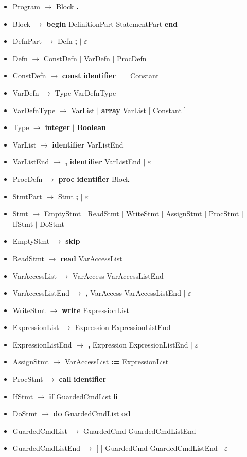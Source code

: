 \documentclass{article}
\let\bf\textbf
\newcommand{\der}{$\longrightarrow$ }
\newcommand{\es}{$\varepsilon$ }
\newcommand{\alt}{\Large$|$ \normalsize }
\begin{document}
\begin{itemize}[label={}]
    \item Program \der Block \bf .
    \item Block \der \bf{begin} DefinitionPart StatementPart \bf{end}
    \item DefnPart \der Defn \bf ; \alt \es
    \item Defn \der ConstDefn \alt VarDefn \alt ProcDefn
    \item ConstDefn \der \bf{const} \bf{identifier} $=$ Constant
    \item VarDefn \der Type VarDefnType
    \item VarDefnType \der VarList \alt \bf{array} VarList [ Constant ]
    \item Type \der \bf{integer} \alt \bf {Boolean}
    \item VarList \der \bf{identifier} VarListEnd
    \item VarListEnd \der \bf, \bf{identifier} VarListEnd \alt \es
    \item ProcDefn \der \bf{proc} \bf{identifier} Block
    \item StmtPart \der Stmt \bf ; \alt \es
    \item Stmt \der EmptyStmt \alt ReadStmt \alt WriteStmt \alt AssignStmt \alt ProcStmt \alt IfStmt \alt DoStmt
    \item EmptyStmt \der \bf{skip}
    \item ReadStmt \der \bf{read} VarAccessList
    \item VarAccessList \der VarAccess VarAccessListEnd
    \item VarAccessListEnd \der \bf , VarAccess VarAccessListEnd \alt \es
    \item WriteStmt \der \bf{write} ExpressionList
    \item ExpressionList \der Expression ExpressionListEnd
    \item ExpressionListEnd \der \bf, Expression ExpressionListEnd \alt \es 
    \item AssignStmt \der VarAccessList \bf{:=} ExpressionList
    \item ProcStmt \der \bf{call} \bf{identifier}
    \item IfStmt \der \bf{if} GuardedCmdList \bf{fi}
    \item DoStmt \der \bf{do} GuardedCmdList \bf{od}
    \item GuardedCmdList \der GuardedCmd GuardedCmdListEnd
    \item GuardedCmdListEnd \der [ ] GuardedCmd GuardedCmdListEnd \alt \es

\end{itemize}
\end{document}
